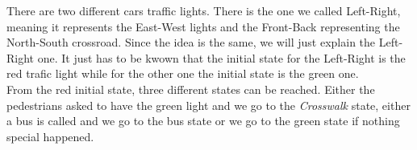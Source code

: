 There are two different cars traffic lights. There is the one we called Left-Right, meaning it represents the East-West lights and the Front-Back representing the North-South crossroad. Since the idea is the same, we will just explain the Left-Right one. It just has to be kwown that the initial state for the Left-Right is the red trafic light while for the other one the initial state is the green one. \\

From the red initial state, three different states can be reached. Either the pedestrians asked to have the green light and we go to the \textit{Crosswalk} state, either a bus is called and we go to the bus state or we go to the green state if nothing special happened.

